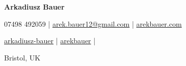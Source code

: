 \documentclass[a4paper,11pt]{article}
\newcommand{\socialicon}[1]{\raisebox{-0.05em}{\resizebox{!}{1em}{#1}}}
\newcommand{\headerfontiii}{\fontfamily{ppl}\selectfont} %
\begin{document}
\headerfontiii

\begin{center}
    {\Huge\textbf{Arkadiusz Bauer}}
\end{center}
\vspace{-6mm}

\begin{center}
    \small{
    07498 492059 | \href{mailto:arek.bauer12@gmail.com}{arek.bauer12@gmail.com} | 
    \href{https://www.arekbauer.com}{arekbauer.com}
    }
\end{center}
\vspace{-6mm}

\begin{center}
    \small{
    \socialicon{\faLinkedin} \href{https://www.linkedin.com/in/arkadiusz-bauer/}{arkadiusz-bauer} | 
    \socialicon{\faGithub} \href{https://github.com/arekbauer}{arekbauer} | 
    }
\end{center}
\vspace{-6mm}
\begin{center}
    \small{Bristol, UK}
\end{center}

\vspace{-6mm}
\end{document}
